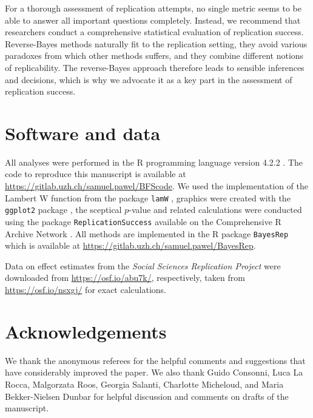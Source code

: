 For a thorough assessment of replication attempts, no single metric seems to be
able to answer all important questions completely. Instead, we recommend that
researchers conduct a comprehensive statistical evaluation of replication
success. Reverse-Bayes methods naturally fit to the replication setting, they
avoid various paradoxes from which other methods suffers, and they combine
different notions of replicability. The reverse-Bayes approach therefore leads
to sensible inferences and decisions, which is why we advocate it as a key part
in the assessment of replication success.

\section*{Software and data}
All analyses were performed in the R programming language version
4.2.2 \citep{R}. The code to
reproduce this manuscript is available at
\url{https://gitlab.uzh.ch/samuel.pawel/BFScode}. We used the implementation of
the Lambert W function from the package \texttt{lamW} \citep{Adler2015},
graphics were created with the \texttt{ggplot2} package \citep{Wickham2016}, the
sceptical $p$-value and related calculations were conducted using the package
\texttt{ReplicationSuccess} available on the Comprehensive R Archive Network
\citep{Held2020}. All methods are implemented in the R package \texttt{BayesRep}
which is available at \url{https://gitlab.uzh.ch/samuel.pawel/BayesRep}.

Data on effect estimates from the \emph{Social Sciences Replication Project}
\citep{Camerer2018} were downloaded from \url{https://osf.io/abu7k/},
respectively, taken from \url{https://osf.io/nsxgj/} for exact calculations.

\section*{Acknowledgements}
We thank the anonymous referees for the helpful comments and suggestions that
have considerably improved the paper. We also thank Guido Consonni, Luca La
Rocca, Malgorzata Roos, Georgia Salanti, Charlotte Micheloud, and Maria
Bekker-Nielsen Dunbar for helpful discussion and comments on drafts of the
manuscript.


